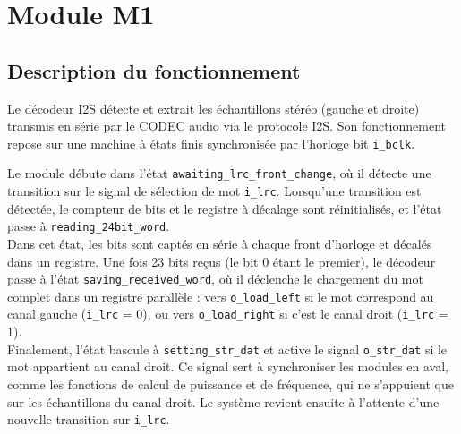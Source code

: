 \section{Module M1}



\subsection{Description du fonctionnement}

Le décodeur I2S détecte et extrait les échantillons stéréo (gauche et droite)
transmis en série par le CODEC audio via le protocole I2S. Son
fonctionnement repose sur une machine à états finis synchronisée par
l'horloge bit \verb|i_bclk|.\\


Le module débute dans l'état \verb|awaiting_lrc_front_change|, où il détecte
une transition sur le signal de sélection de mot \verb|i_lrc|. Lorsqu'une transition
est détectée, le compteur de bits et le registre à décalage sont réinitialisés,
et l'état passe à \verb|reading_24bit_word|.\\

Dans cet état, les bits sont captés en série à chaque front d'horloge et
décalés dans un registre. Une fois 23 bits reçus (le bit 0 étant le premier),
le décodeur passe à l'état \verb|saving_received_word|, où il déclenche le chargement
du mot complet dans un registre parallèle : vers \verb|o_load_left| si le mot
correspond au canal gauche (\verb|i_lrc| = 0), ou vers \verb|o_load_right| si
c'est le canal droit (\verb|i_lrc| = 1).\\

Finalement, l'état bascule à \verb|setting_str_dat| et active le signal \verb|o_str_dat| si le mot
appartient au canal droit. Ce signal sert à synchroniser les modules en aval,
comme les fonctions de calcul de puissance et de fréquence, qui ne s'appuient
que sur les échantillons du canal droit. Le système revient ensuite à l'attente
d'une nouvelle transition sur \verb|i_lrc|.\\

